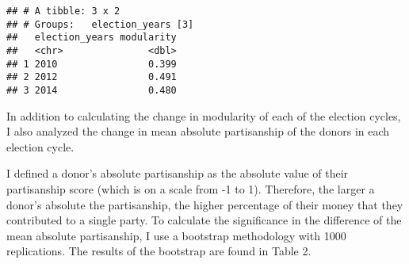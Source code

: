 \documentclass[11pt,]{article}
\newenvironment{Shaded}{\begin{snugshade}}{\end{snugshade}}
\newcommand{\KeywordTok}[1]{\textcolor[rgb]{0.13,0.29,0.53}{\textbf{#1}}}
\newcommand{\DataTypeTok}[1]{\textcolor[rgb]{0.13,0.29,0.53}{#1}}
\newcommand{\StringTok}[1]{\textcolor[rgb]{0.31,0.60,0.02}{#1}}
\newcommand{\OperatorTok}[1]{\textcolor[rgb]{0.81,0.36,0.00}{\textbf{#1}}}
\newcommand{\NormalTok}[1]{#1}
\begin{document}
\begin{Shaded}
\end{Shaded}

\begin{Shaded}
\end{Shaded}

\begin{verbatim}
## # A tibble: 3 x 2
## # Groups:   election_years [3]
##   election_years modularity
##   <chr>               <dbl>
## 1 2010                0.399
## 2 2012                0.491
## 3 2014                0.480
\end{verbatim}

In addition to calculating the change in modularity of each of the
election cycles, I also analyzed the change in mean absolute
partisanship of the donors in each election cycle.

I defined a donor's absolute partisanship as the absolute value of their
partisanship score (which is on a scale from -1 to 1). Therefore, the
larger a donor's absolute the partisanship, the higher percentage of
their money that they contributed to a single party. To calculate the
significance in the difference of the mean absolute partisanship, I use
a bootstrap methodology with 1000 replications. The results of the
bootstrap are found in Table 2.
\end{document}
